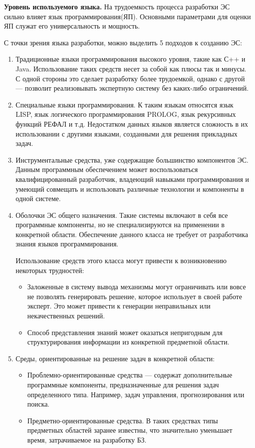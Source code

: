 \textbf{Уровень используемого языка.} На трудоемкость процесса разработки ЭС сильно влияет язык программирования(ЯП). Основными параметрами для оценки ЯП служат его универсальность и мощность.

С точки зрения языка разработки, можно выделить 5 подходов к созданию ЭС:

\begin{enumerate}
	\item Традиционные языки программирования высокого уровня, такие как С++ и Java. Использование таких средств несет за собой как плюсы так и минусы. С одной стороны это сделает разработку более трудоемкой, однако с другой --- позволит реализовывать экспертную систему без каких-либо ограничений.

	\item Специальные языки программирования. К таким языкам относятся язык LISP, язык логического программирования PROLOG, язык рекурсивных функций РЕФАЛ и т.д. Недостатком данных языков является сложность в их использовании с другими языками, созданными для решения прикладных задач.

	\item Инструментальные средства, уже содержащие большинство компонентов ЭС. Данным программным обеспечением может воспользоваться квалифицированный разработчик, владеющий навыками программирования и умеющий совмещать и использовать различные технологии и компоненты в одной системе.

	\item Оболочки ЭС общего назначения. Такие системы включают в себя все программные компоненты, но не специализируются на применении в конкретной области. Обеспечение данного класса не требует от разработчика знания языков программирования.

	Использование средств этого класса могут привести к возникновению некоторых трудностей:

	\begin{itemize}
		\item Заложенные в систему вывода механизмы могут ограничивать или вовсе не позволять генерировать решение, которое использует в своей работе эксперт. Это может привести к генерации неправильных или некачественных решений. 
		\item Способ представления знаний может оказаться непригодным для структурирования информации из конкретной предметной области.
		\end{itemize}

		\item Среды, ориентированные на решение задач в конкретной области:
		\begin{itemize}
		\item Проблемно-ориентированные средства --- содержат дополнительные программные компоненты, предназначенные для решения задач определенного типа. Например, задач управления, прогнозирования или поиска.
		\item Предметно-ориентированные средства. В таких средствах типы предметных областей заранее известны, что значительно уменьшает время, затрачиваемое на разработку БЗ.
	\end{itemize}

\end{enumerate}

